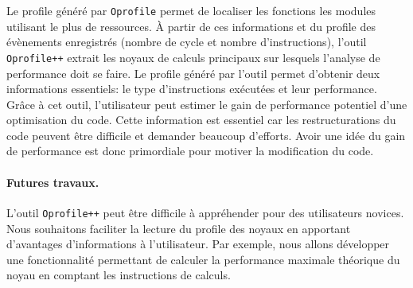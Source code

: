     Le profile généré par \verb|Oprofile| permet de localiser les fonctions les modules utilisant le plus de ressources. À partir de ces informations et du profile des évènements enregistrés (nombre de cycle et nombre d'instructions), l'outil \verb|Oprofile++| extrait les noyaux de calculs principaux sur lesquels l'analyse de performance doit se faire. Le profile généré par l'outil permet d'obtenir deux informations essentiels: le type d'instructions exécutées et leur performance. Grâce à cet outil, l'utilisateur peut estimer le gain de performance potentiel d'une optimisation du code. Cette information est essentiel car les restructurations du code peuvent être difficile et demander beaucoup d'efforts. Avoir une idée du gain de performance est donc primordiale pour motiver la modification du code. 


    \paragraph{Futures travaux.} L'outil \verb|Oprofile++| peut être difficile à appréhender pour des utilisateurs novices. Nous souhaitons faciliter la lecture du profile des noyaux en apportant d'avantages d'informations à l'utilisateur. Par exemple, nous allons développer une fonctionnalité permettant de calculer la performance maximale théorique du noyau en comptant les instructions de calculs.
    